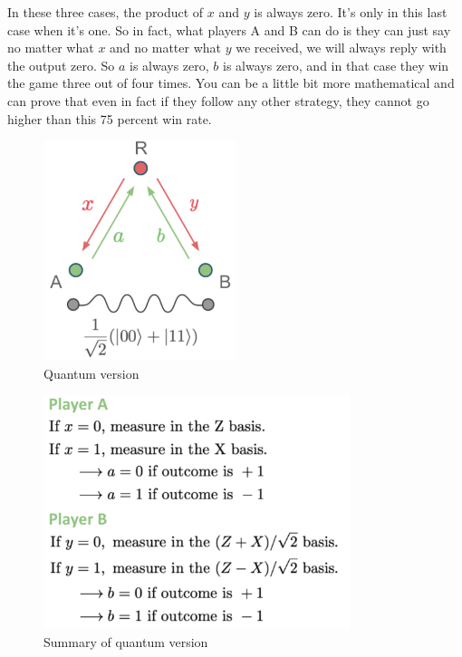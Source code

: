 In these three cases, the product of $x$ and $y$ is always zero. It's only in this last case when it's one. So in fact, what players A and B can do is they can just say no matter what $x$ and no matter what $y$ we received, we will always reply with the output zero. So $a$ is always zero, $b$ is always zero, and in that case they win the game three out of four times. You can be a little bit more mathematical and can prove that even in fact if they follow any other strategy, they cannot go higher than this 75 percent win rate. 


\begin{figure}[H]
    \centering
    \includegraphics[width=0.5\textwidth]{lesson4/CHSH_quantum_diagram.pdf}
        \caption{Quantum version}
    \label{fig:chsh-quantum}
\end{figure}

\begin{figure}[H]
    \centering
    \includegraphics[width=0.8\textwidth]{lesson4/CHSH_quantum_guide.pdf}
        \caption{Summary of quantum version}
    \label{fig:chsh-quantum-summary}
\end{figure}


